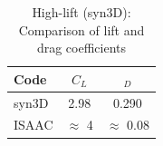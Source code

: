 \begin{table}
    \centering
    \caption{High-lift (syn3D): Comparison of lift and drag coefficients}
    \label{tab:highld}
    \begin{tabular}{l cc}
        \toprule
        Code & $C_L$ & $_D$ \\
        \midrule
        syn3D & 2.98 & 0.290\\
        ISAAC & $\approx$ 4 & $\approx$ 0.08\\
        \bottomrule
    \end{tabular}
\end{table}